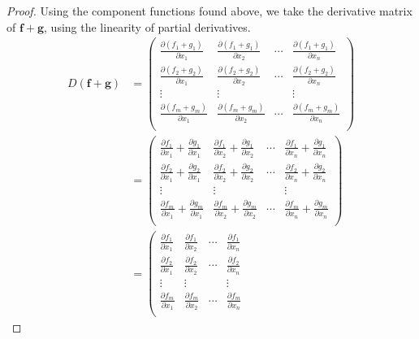 \documentclass{ximera}
\begin{document}
\begin{proof}
Using the component functions found above, we take the derivative matrix of $\mathbf{f}+\mathbf{g}$, using the linearity of partial derivatives.
\begin{align*}
D(\mathbf{f}+\mathbf{g}) &=\left(\begin{array}{cccc}
\frac{\partial (f_1+g_1)}{\partial x_1} & \frac{\partial (f_1+g_1)}{\partial x_2} & \cdots &\frac{\partial (f_1+g_1)}{\partial x_n}\\
 \frac{\partial (f_2+g_2)}{\partial x_1} & \frac{\partial (f_2+g_2)}{\partial x_2} & \cdots &\frac{\partial (f_2+g_2)}{\partial x_n}\\
 \vdots & \vdots && \vdots\\
 \frac{\partial (f_m+g_m)}{\partial x_1} & \frac{\partial (f_m+g_m)}{\partial x_2} & \cdots &\frac{\partial (f_m+g_m)}{\partial x_n}\\
\end{array}\right)\\
&=\left(\begin{array}{cccc}
\frac{\partial f_1}{\partial x_1}+\frac{\partial g_1}{\partial x_1} & \frac{\partial f_1}{\partial x_2}+\frac{\partial g_1}{\partial x_2} & \cdots &\frac{\partial f_1}{\partial x_n}+\frac{\partial g_1}{\partial x_n}\\
\frac{\partial f_2}{\partial x_1}+\frac{\partial g_2}{\partial x_1} & \frac{\partial f_2}{\partial x_2}+\frac{\partial g_2}{\partial x_2} & \cdots &\frac{\partial f_2}{\partial x_n}+\frac{\partial g_2}{\partial x_n}\\
 \vdots & \vdots && \vdots\\
\frac{\partial f_m}{\partial x_1}+\frac{\partial g_m}{\partial x_1} & \frac{\partial f_m}{\partial x_2}+\frac{\partial g_m}{\partial x_2} & \cdots &\frac{\partial f_m}{\partial x_n}+\frac{\partial g_m}{\partial x_n}\\
\end{array}\right)\\
&=\left(\begin{array}{cccc}
\frac{\partial f_1}{\partial x_1} & \frac{\partial f_1}{\partial x_2} & \cdots &\frac{\partial f_1}{\partial x_n}\\
\frac{\partial f_2}{\partial x_1} & \frac{\partial f_2}{\partial x_2} & \cdots &\frac{\partial f_2}{\partial x_n}\\
 \vdots & \vdots && \vdots\\
\frac{\partial f_m}{\partial x_1} & \frac{\partial f_m}{\partial x_2} & \cdots &\frac{\partial f_m}{\partial x_n}\\

\end{array}
\end{align*}
\end{proof}
\end{document}

